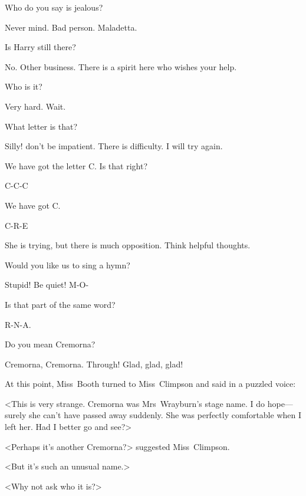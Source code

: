 \begin{dialogue}
 Who do you say is jealous?

 Never mind. Bad person. Maladetta.

 Is Harry still there?

 No. Other business. There is a spirit here who wishes your help.

 Who is it?

 Very hard. Wait.


 What letter is that?

 Silly! don't be impatient. There is difficulty. I will try again.


 We have got the letter C\@. Is that right?

 C-C-C

 We have got C\@.

 C-R-E


  She is trying, but there is much opposition. Think helpful thoughts.

 Would you like us to sing a hymn?

  Stupid! Be quiet!  M-O-

 Is that part of the same word?

 R-N-A\@.

 Do you mean Cremorna?

  Cremorna, Cremorna. Through! Glad, glad, glad!
\end{dialogue}

At this point, Miss~Booth turned to Miss~Climpson and said in a puzzled voice:

<This is very strange. Cremorna was Mrs~Wrayburn's stage name. I do hope—surely she can't have passed away suddenly. She was perfectly comfortable when I left her. Had I better go and see?>

<Perhaps it's another Cremorna?> suggested Miss~Climpson.

<But it's such an unusual name.>

<Why not ask who it is?>

